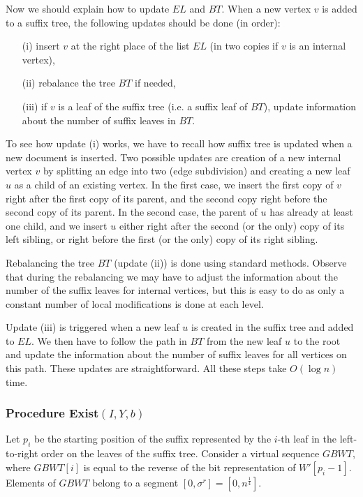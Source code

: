 \documentclass[10pt]{llncs}
\newcommand{\exist}{{\sc Exist}}
\newcommand{\GBWT}{\mathit{GBWT}}
\begin{document}
Now we should explain how to update $EL$ and $BT$. When a new vertex $v$ is added to a suffix tree, the following updates should be done (in order):

\begin{itemize}
\item[(i)] insert $v$ at the right place of the list $EL$ (in two copies if $v$ is an internal vertex),
\item[(ii)] rebalance the tree $BT$ if needed,
\item[(iii)] if $v$ is a leaf of the suffix tree (i.e. a suffix leaf of $BT$), update information about the number of suffix leaves in $BT$.
\end{itemize}

To see how update (i) works, we have to recall how suffix tree is updated when a new document is inserted. Two possible updates are creation of a new internal vertex $v$ by splitting an edge into two (edge subdivision) and creating a new leaf $u$ as a child of an existing vertex. In the first case, we insert the first copy of $v$ right after the first copy of its parent, and the second copy right before the second copy of its parent. In the second case, the parent of $u$ has already at least one child, and we insert $u$ either right after the second (or the only) copy of its left sibling, or right before the first (or the only) copy of its right sibling. 

Rebalancing the tree $BT$ (update (ii)) is done using standard methods. Observe that during the rebalancing we may have to adjust the information about the number of the suffix leaves for internal vertices, but this is easy to do as only a constant number of local modifications is done at each level.

Update (iii) is triggered when a new leaf $u$ is created in the suffix tree and added to $EL$. We then have to follow the path in $BT$ from the new leaf $u$ to the root and update the information about the number of suffix leaves for all vertices on this path. These updates are
straightforward. All these steps take $O(\log n)$ time. 

\subsubsection{Procedure \exist$(I, Y, b)$}
Let $p_i$ be the starting position of the suffix represented by the $i$-th leaf in the left-to-right order on the leaves of the suffix tree. Consider a virtual sequence $\GBWT$, where $\GBWT[i]$ is equal to the reverse of the bit representation of $W'[p_i-1]$. Elements of $\GBWT$ belong to a segment $[0,\sigma^{r}] = [0,n^{\frac{1}{4}}]$.
\end{document}
